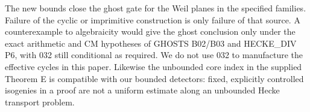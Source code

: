 The new bounds close the ghost gate for the Weil planes in the
specified families. Failure of the cyclic or imprimitive construction
is only failure of that source. A counterexample to algebraicity
would give the ghost conclusion only under the exact arithmetic and
CM hypotheses of GHOSTS B02/B03 and HECKE\_DIV P6, with 032 still
conditional as required. We do not use 032 to manufacture the
effective cycles in this paper. Likewise the unbounded core index
in the supplied Theorem E is compatible with our bounded detectors:
fixed, explicitly controlled isogenies in a proof are not a uniform
estimate along an unbounded Hecke transport problem.
